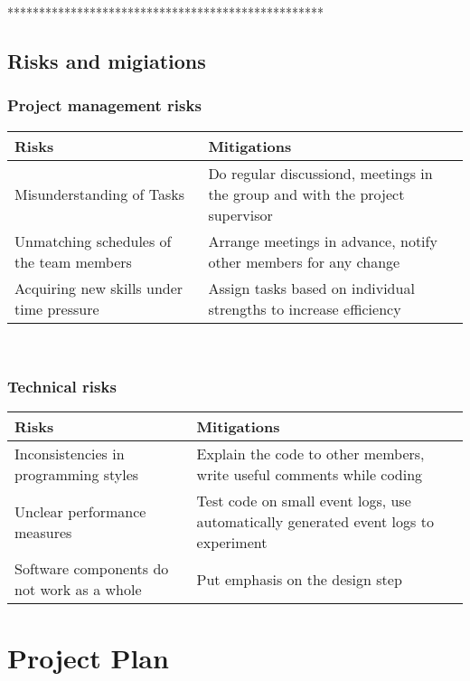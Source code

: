 \documentclass[notitlepage]{article}
\begin{document}
\begin{flushleft}
{\color{gray} **************************************************}


\subsection{Risks and migiations}

\subsubsection{Project management risks}

\begin{tabularx}{12cm}{|X|X|}
\hline
\textbf{Risks} &\textbf{Mitigations}\\
\hline
Misunderstanding of Tasks & Do regular discussiond, meetings in the group and with the project supervisor\\
\hline
Unmatching schedules of the team members & Arrange meetings in advance, notify other members for any change  \\
\hline
Acquiring new skills under time pressure & Assign tasks based on individual strengths to increase efficiency \\ 
\hline
\end{tabularx}\\ 


\subsubsection{Technical risks}

\begin{tabularx}{12cm}{|X|X|}
\hline
\textbf{Risks} &\textbf{Mitigations}\\
\hline
Inconsistencies in programming styles & Explain the code to other members, write useful comments while coding\\
\hline
Unclear performance measures & Test code on small event logs, use automatically generated event logs to experiment \\
\hline
Software components do not work as a whole & Put emphasis on the design step \\ 
\hline
\end{tabularx}






\section{Project Plan}


\end{flushleft}
\end{document}
